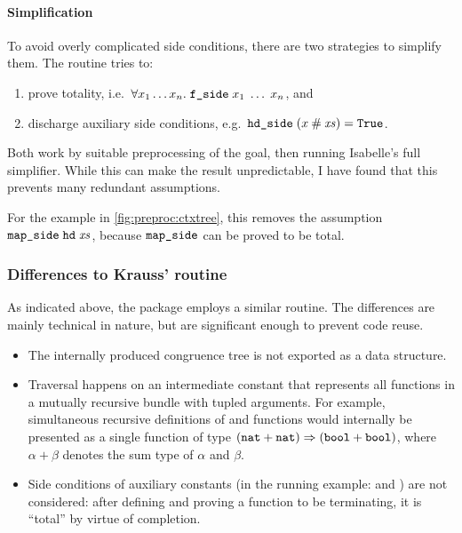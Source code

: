 \paragraph{Simplification}
To avoid overly complicated side conditions, there are two strategies to simplify them.
The routine tries to:
\begin{enumerate}
  \item prove totality, i.e.\ $\forall x_1 \ldots x_n.\;\texttt{\textup{f\_side}}\;x_1\;\ldots\;x_n$, and
  \item discharge auxiliary side conditions, e.g.\ $\texttt{\textup{hd\_side}}\;(x \mathbin{\mathtt{\#}} \mathit{xs}) = \texttt{\textup{True}}$.
\end{enumerate}

\noindent
Both work by suitable preprocessing of the goal, then running Isabelle's full simplifier.
While this can make the result unpredictable, I have found that this prevents many redundant assumptions.

For the example in \cref{fig:preproc:ctxtree}, this removes the assumption $\texttt{\textup{map\_side}}\;\texttt{\textup{hd}}\;\mathit{xs}$, because $\texttt{\textup{map\_side}}$ can be proved to be total.


\subsubsection{Differences to Krauss' routine}

As indicated above, the  package employs a similar routine.
The differences are mainly technical in nature, but are significant enough to prevent code reuse.
\begin{itemize}
  \item
    The internally produced congruence tree is not exported as a data structure.
  \item
    Traversal happens on an intermediate constant that represents all functions in a mutually recursive bundle with tupled arguments.
    For example, simultaneous recursive definitions of  and  functions would internally be presented as a single function of type $(\texttt{\textup{nat}} + \texttt{\textup{nat}}) \Rightarrow (\texttt{\textup{bool}} + \texttt{\textup{bool}})$, where $\alpha + \beta$ denotes the sum type of $\alpha$ and $\beta$.
  \item
    Side conditions of auxiliary constants (in the running example:  and ) are not considered: after defining and proving a function to be terminating, it is ``total'' by virtue of completion.
\end{itemize}

